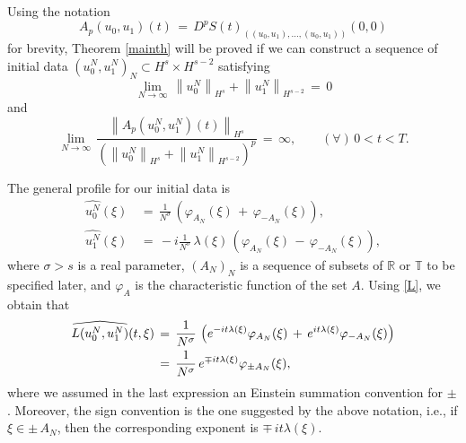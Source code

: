 \documentclass{amsart}
\newcommand{\R}{\mathbb{R}}
\begin{document}
Using the notation
\[
A_p(u_0,u_1)(t)\,=\,D^pS(t)_{\left((u_0,u_1),\ldots, (u_0,u_1)\right)}(0,0)
\]
for brevity, Theorem \ref{mainth} will be proved if we can construct a sequence of initial data $\left(u^N_0,u^N_1\right)_N\subset H^s\times H^{s-2}$ satisfying
\begin{equation}
\lim_{N\to \infty}\, \left\|u_0^N\right\|_{H^{s}} + \left\|u_1^N\right\|_ {H^{s-2}}\,=\,0
\label{ivhs}
\end{equation}
and 
\begin{equation}
\lim_{N\to \infty}\, \frac{\left\|A_{p}(u_0^N,u_1^N)(t)\right\|_{H^s}}{\left(\left\|u_0^N\right\|_{H^{s}} + \left\|u_1^N\right\|_ {H^{{s}-2}}\right)^p}\,=\,\infty, \qquad (\forall)\, 0 < t < T.
\label{ratio}
\end{equation}

The general profile for our initial data is
\begin{align}
\widehat{u^N_0}(\xi)\,&=\,\frac{1}{N^{\sigma}}\,\left(\varphi_{A_N}(\xi)\,+\,\varphi_{-A_N}(\xi)\right), \label{u0n}\\
\widehat{u^N_1}(\xi)\,&=\,-i \frac{1}{N^{\sigma}}\,\lambda(\xi)\,\left(\varphi_{A_N}(\xi)\,-\,\varphi_{-A_N}(\xi)\right),\label{u1n}
\end{align}
where $\sigma>s$ is a real parameter, $(A_N)_N$ is a sequence of subsets of $\R$ or $\mathbb{T}$ to be specified later, and $\varphi_A$ is the characteristic function of the set $A$. Using \eqref{L}, we obtain that
\begin{equation}\aligned
\widehat{L(u^N_0,u^N_1)}(t,\xi)\,&=\, \frac{1}{N^\sigma}\,\left(e^{-it\lambda(\xi)}\varphi_{A_N}(\xi)\,+\,e^{it\lambda(\xi)}\varphi_{-A_N}(\xi)\right)\\
&=\,\frac{1}{N^\sigma}\,e^{\mp it\lambda(\xi)}\varphi_{\pm A_N}(\xi),
\endaligned
\label{l+}
\end{equation}
where we assumed in the last expression an Einstein summation convention for $\pm$. Moreover, the sign convention is the one suggested by the above notation, i.e., if $\xi\in \pm \,A_N$, then the corresponding exponent is $\mp \,it\lambda(\xi)$. 
\end{document}

